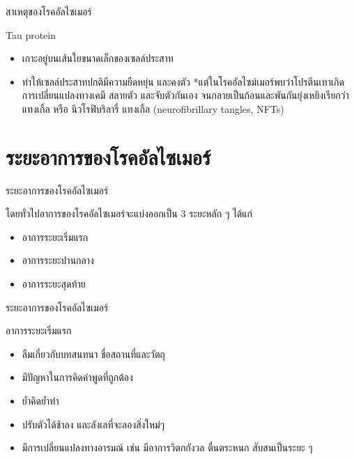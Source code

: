 \documentclass[xetex,serif]{beamer}
\begin{document}
\begin{frame}{สาเหตุของโรคอัลไซเมอร์}

  {\large Tau protein}

  \begin{itemize}
    \item เกาะอยู่บนเส้นใยขนาดเล็กของเซลล์ประสาท
    \item ทำให้เซลล์ประสาทปกติมีความยืดหยุ่น และคงตัว *แต่ในโรคอัลไซม์เมอร์พบว่าโปรตีนเทาเกิดการเปลี่ยนแปลงทางเคมี สลายตัว และจับตัวกันเอง จนกลายเป็นก้อนและพันกันยุ่งเหยิงเรียกว่า แทงเกิ้ล หรือ นิวโรฟิบริลารี่ แทงเกิ้ล (neurofibrillary tangles, NFTs) 
  \end{itemize}
\end{frame}

\section{ระยะอาการของโรคอัลไซเมอร์}

\begin{frame}{ระยะอาการของโรคอัลไซเมอร์}

  {\large โดยทั่วไปอาการของโรคอัลไซเมอร์จะแบ่งออกเป็น 3 ระยะหลัก ๆ ได้แก่}

  \begin{itemize}
    \item อาการระยะเริ่มแรก 
    \item อาการระยะปานกลาง 
    \item อาการระยะสุดท้าย 
  \end{itemize}
\end{frame}

\begin{frame}{ระยะอาการของโรคอัลไซเมอร์}

  {\Large อาการระยะเริ่มแรก}

  \begin{itemize}
    \item ลืมเกี่ยวกับบทสนทนา ชื่อสถานที่และวัตถุ 
    \item มีปัญหาในการคิดคำพูดที่ถูกต้อง 
    \item ย้ำคิดย้ำทำ 
    \item ปรับตัวได้ช้าลง และลังเลที่จะลองสิ่งใหม่ๆ 
    \item มีการเปลี่ยนแปลงทางอารมณ์ เช่น มีอาการวิตกกังวล ตื่นตระหนก สับสนเป็นระยะ ๆ
  \end{itemize}
\end{frame}
\end{document}
